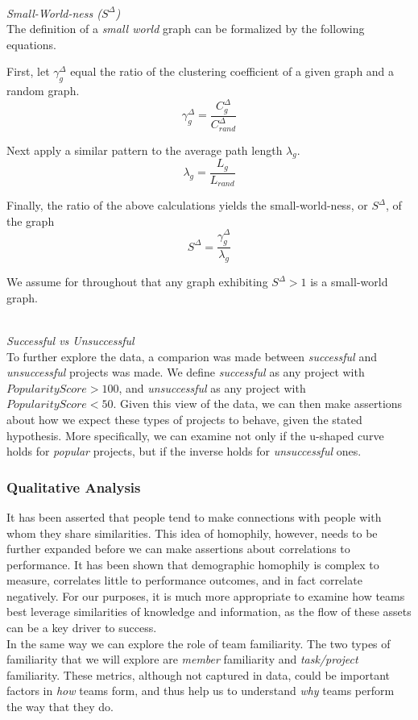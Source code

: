 \documentclass{proc}
\begin{document}
\noindent\\\textit{Small-World-ness ($S^\Delta$)}\\
The definition of a \textit{small world} graph can be formalized by the following equations\cite{humphries2008network}.

First, let $\gamma^{\Delta}_g$ equal the ratio of the clustering coefficient of a given graph and a random graph.
\[\gamma^{\Delta}_g = \frac{C^{\Delta}_g }{C^{\Delta}_{rand} } \]

Next apply a similar pattern to the average path length $\lambda_g$.
\[\lambda_g = \frac{L_g }{L_{rand} } \]

Finally, the ratio of the above calculations yields the small-world-ness, or $S^\Delta$, of the graph
\[S^\Delta = \frac{\gamma^{\Delta}_g }{\lambda_g} \]

We assume for throughout that any graph exhibiting $S^\Delta > 1$ is a small-world graph.

\noindent\\\textit{Successful vs Unsuccessful}\\
To further explore the data, a comparion was made between \textit{successful} and \textit{unsuccessful} projects was made. We define \textit{successful} as any project with {$PopularityScore > 100$}, and \textit{unsuccessful} as any project with {$PopularityScore < 50$}. Given this view of the data, we can then make assertions about how we expect these types of projects to behave, given the stated hypothesis. More specifically, we can examine not only if the u-shaped curve holds for \textit{popular} projects, but if the inverse holds for \textit{unsuccessful} ones.


\subsubsection{Qualitative Analysis}
It has been asserted that people tend to make connections with people with whom they share similarities\cite{mcpherson2001birds}. This idea of homophily, however, needs to be further expanded before we can make assertions about correlations to performance. It has been shown that demographic homophily is complex to measure, correlates little to performance outcomes, and in fact correlate negatively\cite{reagans2004make,lawrence1997perspective}. For our purposes, it is much more appropriate to examine how teams best leverage similarities of knowledge and information, as the flow of these assets can be a key driver to success\cite{nissen2002extended}.\\
In the same way we can explore the role of team familiarity. The two types of familiarity that we will explore are \textit{member} familiarity and \textit{task/project} familiarity\cite{harrison2003time}. These metrics, although not captured in data, could be important factors in \textit{how} teams form, and thus help us to understand \textit{why} teams perform the way that they do.\\
\end{document}
